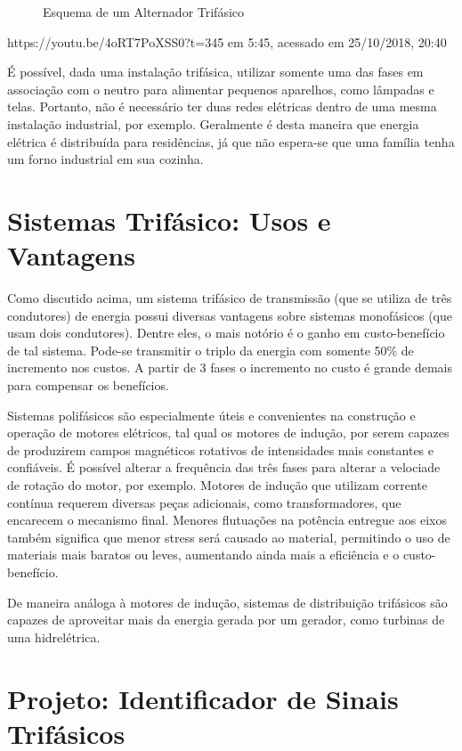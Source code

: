 \documentclass[12pt,a4paper,openany]{abntex2}
\begin{document}
\begin{figure}[!htp]
	\centering
	\caption{Esquema de um Alternador Trifásico}
	\label{fig:alternador-trifasico}
\end{figure}


https://youtu.be/4oRT7PoXSS0?t=345  em 5:45, acessado em 25/10/2018, 20:40

É possível, dada uma instalação trifásica, utilizar somente uma das fases em associação com o neutro para alimentar pequenos aparelhos, como lâmpadas e telas. Portanto, não é necessário ter duas redes elétricas dentro de uma mesma instalação industrial, por exemplo. Geralmente é desta maneira que energia elétrica é distribuída para residências, já que não espera-se que uma família tenha um forno industrial em sua cozinha.

\section{Sistemas Trifásico: Usos e Vantagens}

Como discutido acima, um sistema trifásico de transmissão (que se utiliza de três condutores) de energia possui diversas vantagens sobre sistemas monofásicos (que usam dois condutores). Dentre eles, o mais notório é o ganho em custo-benefício de tal sistema. Pode-se transmitir o triplo da energia com somente 50\% de incremento nos custos. A partir de 3 fases o incremento no custo é grande demais para compensar os benefícios.

Sistemas polifásicos são especialmente úteis e convenientes na construção e operação de motores elétricos, tal qual os motores de indução, por serem capazes de produzirem campos magnéticos rotativos de intensidades mais constantes e confiáveis. É possível alterar a frequência das três fases para alterar a velociade de rotação do motor, por exemplo. Motores de indução que utilizam corrente contínua requerem diversas peças adicionais, como transformadores, que encarecem o mecanismo final. Menores flutuações na potência entregue aos eixos também significa que menor stress será causado ao material, permitindo o uso de materiais mais baratos ou leves, aumentando ainda mais a eficiência e o custo-benefício.

De maneira análoga à motores de indução, sistemas de distribuição trifásicos são capazes de aproveitar mais da energia gerada por um gerador, como turbinas de uma hidrelétrica.

\section{Projeto: Identificador de Sinais Trifásicos}
\end{document}
